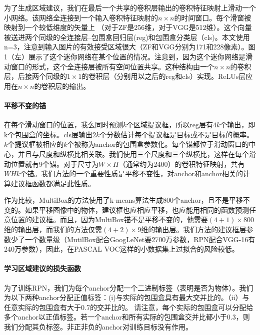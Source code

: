 \documentclass[12pt,a4paper,titlepage]{article}
\begin{document}
为了生成区域建议，我们在最后一个共享的卷积层输出的卷积特征映射上滑动一个小网络。该网络全连接到一个输入卷积特征映射的$n \times n$的时间窗口。每个滑窗被映射到一个较低维度的矢量上 （对于ZF是256维，对于VGG是512维）。这个向量被送进两个同级的全连接层--包围盒回归层(reg)和包围盒分类层（cls)。本文使用n=3，注意到输入图片的有效接受区域很大（ZF和VGG分别为171和228像素）。图1（左）展示了这个迷你网络在某个位置的情况。注意到，因为这个迷你网络是滑动窗口的形式，这个全连接层被所有空间位置共享。这种结构由一个$n \times n$的卷积层，后接两个同级的$1 \times 1$的卷积层（分别用以之后的reg和cls）实现。ReLUs层应用在$n \times n$的卷积层的输出。

\paragraph{平移不变的锚}
在每个滑动窗口的位置，我么同时预测$k$个区域提议框，所以reg层有$4k$个输出，即k个包围盒的坐标。cls层输出$2k$个分数估计每个提议框是目标或不是目标的概率。$k$个提议框被相应的$k$个被称为anchor的包围盒参数化。每个锚都位于滑动窗口的中心，并且与尺度和纵横比相关联。我们使用三个尺度和三个纵横比，这样在每个滑动位置就有9个锚。对于尺寸为$W \times H$（通常约为2400）的卷积特征映射，共有$WHk$个锚。我们方法的一个重要性质是平移不变性，对anchor和anchor相关的计算建议框函数都满足此性质。\par

作为比较，MultiBox的方法使用了k-means算法生成800个anchor，且不是平移不变的。如果平移图像中的物体，建议框也应相应平移，也应能用相同的函数预测任意位置的建议框。而且，因为MultiBox锚不是平移不变的，他需要$(4+1) \times    800$维的输出层，而我们的方法仅需$(4+2) \times 9$维的输出层。我们方法的建议框层参数少了一个数量级（MutilBox配合GoogLeNet要2700万参数，RPN配合VGG-16有240万参数），因此，在PASCAL VOC这样的小数据集上过拟合的风险较低。

\paragraph{学习区域建议的损失函数}
为了训练RPN，我们为每个anchor分配一个二进制标签（表明是否为物体）。我们为以下两种anchor分配正值标签：(i)与实际的包围盒具有最大交并比的。（ii）与任意实际的包围盒有大于0.7的交并比的。 请注意，每个实际的包围盒可以分配给多个anchor以正值标签。若一个anchor和所有实际的包围盒交并比都小于0.3，则我们分配其负标签。非正非负的anchor对训练目标没有作用。\par
\end{document}
